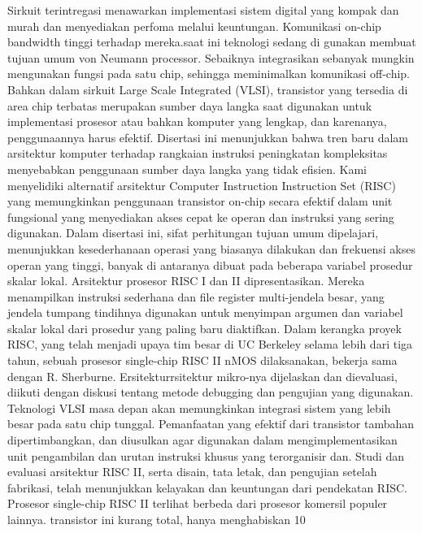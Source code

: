 	Sirkuit terintregasi menawarkan implementasi sistem digital yang kompak dan murah dan menyediakan perfoma melalui keuntungan. 
Komunikasi on-chip bandwidth tinggi terhadap mereka.saat ini teknologi sedang di gunakan membuat tujuan umum von Neumann processor. 
Sebaiknya integrasikan sebanyak mungkin mengunakan fungsi pada satu chip, sehingga meminimalkan komunikasi off-chip.
Bahkan dalam sirkuit Large Scale Integrated (VLSI), transistor yang tersedia di area chip terbatas merupakan sumber daya langka saat digunakan untuk implementasi prosesor atau bahkan komputer yang lengkap, dan karenanya, penggunaannya harus efektif.
Disertasi ini menunjukkan bahwa tren baru dalam arsitektur komputer terhadap rangkaian instruksi peningkatan kompleksitas menyebabkan penggunaan sumber daya langka yang tidak efisien.
Kami menyelidiki alternatif arsitektur Computer Instruction Instruction Set (RISC) yang memungkinkan penggunaan transistor on-chip secara efektif dalam unit fungsional yang menyediakan akses cepat ke operan dan instruksi yang sering digunakan.
Dalam disertasi ini, sifat perhitungan tujuan umum dipelajari, menunjukkan kesederhanaan operasi yang biasanya dilakukan dan frekuensi akses operan yang tinggi, banyak di antaranya dibuat pada beberapa variabel prosedur skalar lokal. 
Arsitektur prosesor RISC I dan II dipresentasikan. Mereka menampilkan instruksi sederhana dan file register multi-jendela besar, yang jendela tumpang tindihnya digunakan untuk menyimpan argumen dan variabel skalar lokal dari prosedur yang paling baru diaktifkan. 
Dalam kerangka proyek RISC, yang telah menjadi upaya tim besar di UC Berkeley selama lebih dari tiga tahun, sebuah prosesor single-chip RISC II nMOS dilaksanakan, bekerja sama dengan R. Sherburne. 
Ersitekturrsitektur mikro-nya dijelaskan dan dievaluasi, diikuti dengan diskusi tentang metode debugging dan pengujian yang digunakan. Teknologi VLSI masa depan akan memungkinkan integrasi sistem yang lebih besar pada satu chip tunggal.
Pemanfaatan yang efektif dari transistor tambahan dipertimbangkan, dan diusulkan agar digunakan dalam mengimplementasikan unit pengambilan dan urutan instruksi khusus yang terorganisir dan.
Studi dan evaluasi arsitektur RISC II, serta disain, tata letak, dan pengujian setelah fabrikasi, telah menunjukkan kelayakan dan keuntungan dari pendekatan RISC. Prosesor single-chip RISC II terlihat berbeda dari prosesor komersil populer lainnya.
transistor ini kurang total, hanya menghabiskan 10%

